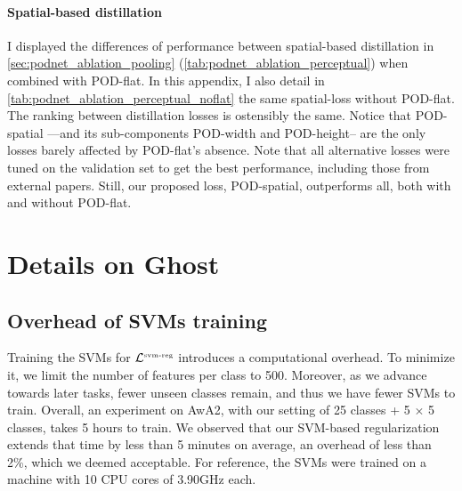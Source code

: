 \paragraph{Spatial-based distillation} I displayed the differences of performance between
spatial-based distillation in \autoref{sec:podnet_ablation_pooling}
(\autoref{tab:podnet_ablation_perceptual}) when combined with POD-flat. In this appendix, I also
detail in \autoref{tab:podnet_ablation_perceptual_noflat} the same spatial-loss without POD-flat.
The ranking between distillation losses is ostensibly the same. Notice that POD-spatial ---and its
sub-components POD-width and POD-height-- are the only losses barely affected by POD-flat's absence.
Note that all alternative losses were tuned on the validation set to get the best performance,
including those from external papers. Still, our proposed loss, POD-spatial, outperforms all, both
with and without POD-flat.





\section{Details on Ghost}
\label{sec:appendix_ghost}


\subsection{Overhead of SVMs training}

Training the SVMs for $\mathcal{L}^{\text{\tiny{svm-reg}}}$ introduces a computational overhead. To
minimize it, we limit the number of features per class to 500. Moreover, as we advance towards later
tasks, fewer unseen classes remain, and thus we have fewer SVMs to train. Overall, an experiment on
AwA2, with our setting of 25 classes + 5 $\times$ 5 classes, takes 5 hours to train. We observed
that our SVM-based regularization extends that time by less than 5 minutes on average, an overhead
of less than 2\%, which we deemed acceptable. For reference, the SVMs were trained on a machine with
10 CPU cores of 3.90GHz each.

